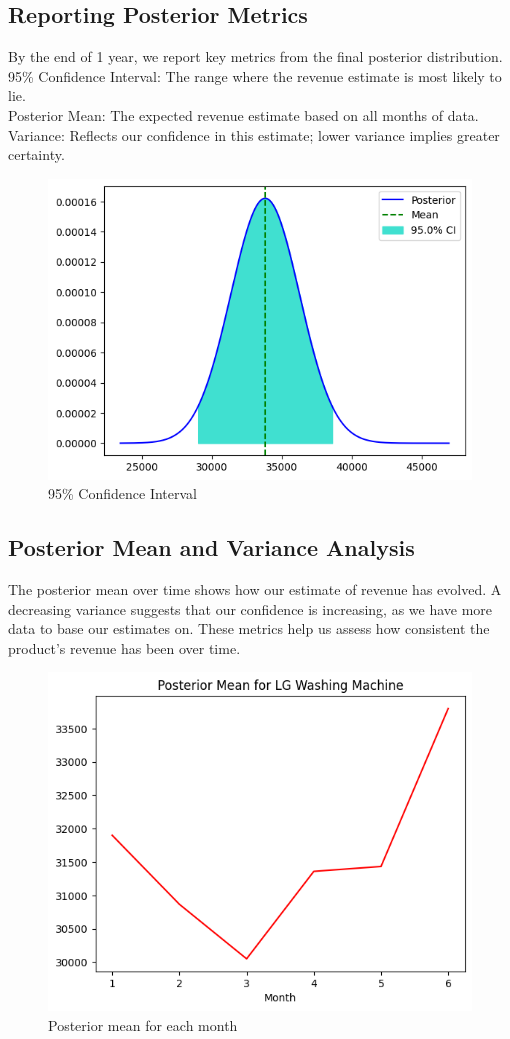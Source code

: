 \subsection{Reporting Posterior Metrics}

By the end of 1 year, we report key metrics from the final posterior distribution. \\
95\% Confidence Interval: The range where the revenue estimate is most likely to lie. \\
Posterior Mean: The expected revenue estimate based on all months of data. \\
Variance: Reflects our confidence in this estimate; lower variance implies greater certainty.

\begin{figure}[!ht]
  \centering
  \includegraphics[width=.6\textwidth]{images/ci.png}
  \caption{95\% Confidence Interval}
\end{figure}

\subsection{Posterior Mean and Variance Analysis}

The posterior mean over time shows how our estimate of revenue has evolved.
A decreasing variance suggests that our confidence is increasing, as we have more data to base our estimates on.
These metrics help us assess how consistent the product's revenue has been over time.

\begin{figure}[!ht]
  \centering
  \includegraphics[width=.5\textwidth]{images/mean.png}
  \caption{Posterior mean for each month}
\end{figure}

